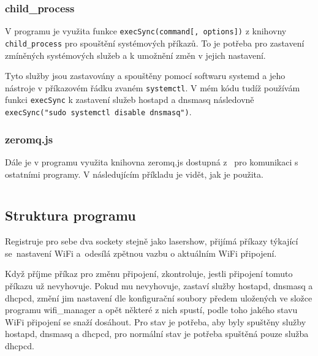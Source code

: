 \subsubsection{child\_process}
V programu je využita funkce \texttt{execSync(command[, options])} z knihovny \texttt{child_process} pro spouštění systémových příkazů. To je potřeba pro zastavení zmíněných systémových služeb a k umožnění změn v jejich nastavení.

Tyto služby jsou zastavovány a spouštěny pomocí softwaru systemd a jeho nástroje v příkazovém řádku zvaném \texttt{systemctl}.
V mém kódu tudíž používám funkci \texttt{execSync} k zastavení služeb hostapd a dnsmasq následovně \texttt{execSync("sudo systemctl disable dnsmasq")}.

\subsubsection{zeromq.js}
Dále je v programu využita knihovna zeromq.js dostupná z~\cite{zeromq.js} pro komunikaci s ostatními programy. V následujícím příkladu je vidět, jak je použita.

\inputminted[frame=lines,fontsize=\footnotesize{}, linenos, breaklines]{js}{code_examples/zmq_server.js}

\subsection{Struktura programu}

Registruje pro sebe dva sockety stejně jako lasershow, přijímá příkazy týkající se~nastavení WiFi a~odesílá zpětnou vazbu o aktuálním WiFi připojení.

Když příjme příkaz pro změnu připojení, zkontroluje, jestli připojení tomuto příkazu už nevyhovuje. Pokud mu nevyhovuje, zastaví služby hostapd, dnsmasq a dhcpcd, změní jim nastavení dle konfigurační soubory předem uložených ve složce programu wifi\_manager a opět některé z nich spustí, podle toho jakého stavu WiFi připojení se snaží dosáhout. Pro  stav je potřeba, aby byly spuštěny služby hostapd, dnsmasq a dhcpcd, pro normální  stav je potřeba spuštěná pouze služba dhcpcd.
